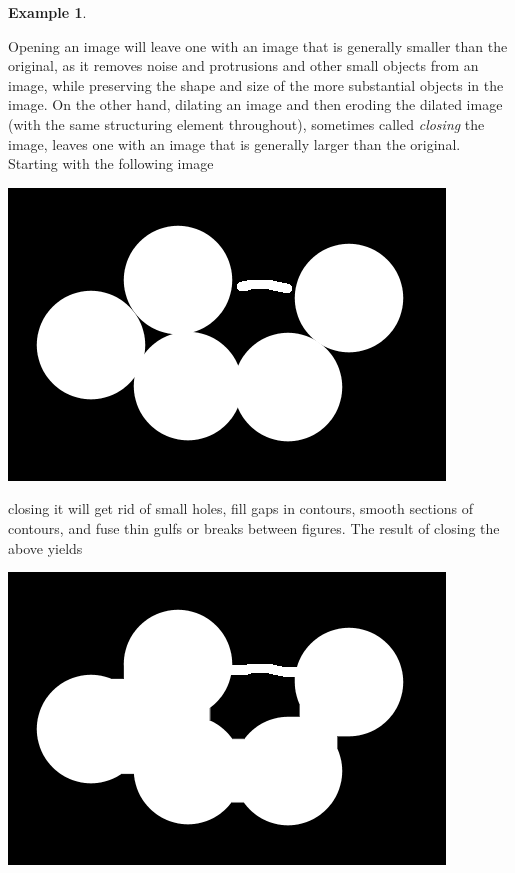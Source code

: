 \documentclass[a4paper]{book}
\theoremstyle{definition}
\newtheorem{example}{Example}[section]
\theoremstyle{definition}
\theoremstyle{definition}
\theoremstyle{theorem}
\theoremstyle{definition}
\begin{document}
\begin{example}
\begin{center}
	\end{center}
	Opening an image will leave one with an image that is generally smaller than the original, as it removes noise and protrusions and other small objects from an image, while preserving the shape and size of the more substantial objects in the image. On the other hand, dilating an image and then eroding the dilated image (with the same structuring element throughout), sometimes called \textit{closing}  the image, leaves one with an image that is generally larger than the original. Starting with the following image
	\begin{center}
		\includegraphics*[scale=0.27]{CirclesOriginal.png}
	\end{center}
	closing it will get rid of small holes, fill gaps in contours, smooth sections of contours, and fuse thin gulfs or breaks between figures. The result of closing the above yields
	\begin{center}
		\includegraphics*[scale=0.27]{CirclesAfterClosing.png}
	\end{center} 

\end{example}
\end{document}
